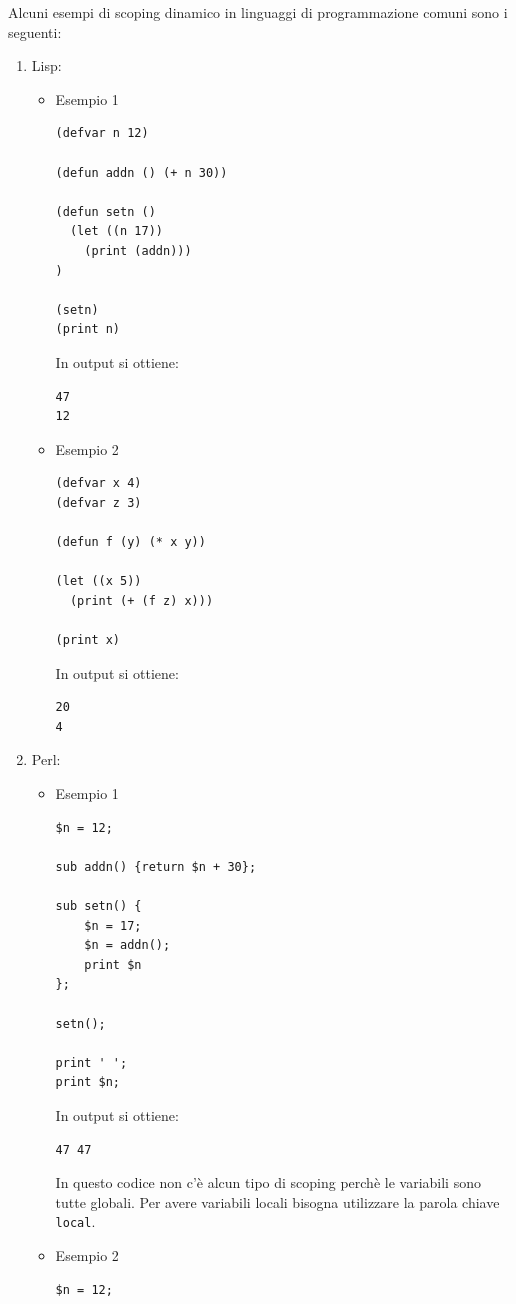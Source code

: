 \documentclass[a4paper]{article}
\begin{document}
\begin{example}
  Alcuni esempi di scoping dinamico in linguaggi di programmazione comuni sono i seguenti:
  \begin{enumerate}
    \item Lisp:
      \begin{itemize}
        \item Esempio 1
\begin{lstlisting}
(defvar n 12)

(defun addn () (+ n 30))

(defun setn () 
  (let ((n 17))
    (print (addn)))
)

(setn)
(print n)
\end{lstlisting}
          In output si ottiene:
\begin{lstlisting}
47
12
\end{lstlisting}

        \item Esempio 2
\begin{lstlisting}
(defvar x 4)
(defvar z 3)

(defun f (y) (* x y))

(let ((x 5))
  (print (+ (f z) x)))

(print x)
\end{lstlisting}
          In output si ottiene:
\begin{lstlisting}
20
4
\end{lstlisting}
      \end{itemize}

    \item Perl:
      \begin{itemize}
        \item Esempio 1
\begin{lstlisting}
$n = 12;

sub addn() {return $n + 30};

sub setn() {
    $n = 17;
    $n = addn();
    print $n
};

setn();

print ' ';
print $n;
\end{lstlisting}
    In output si ottiene:
\begin{lstlisting}
47 47
\end{lstlisting}
          In questo codice non c'è alcun tipo di scoping perchè le variabili sono tutte globali.
          Per avere variabili locali bisogna utilizzare la parola chiave \texttt{local}.

        \item Esempio 2
\begin{lstlisting}
$n = 12;


\end{lstlisting}
\end{itemize}
\end{enumerate}
\end{example}
\end{document}
